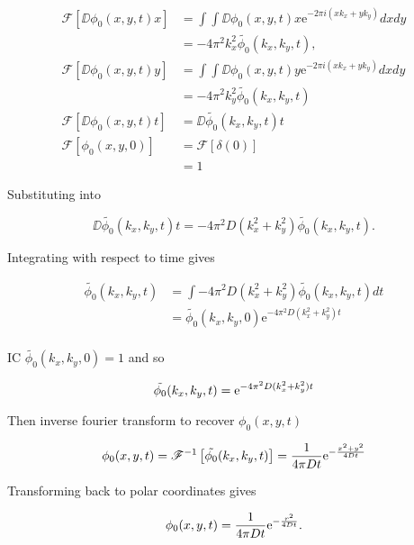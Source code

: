 \begin{equation}
\begin{split}
  \mathscr{F}\left[ \DD{\phi_0(x,y,t)}{x} \right] &= \int \int \DD{\phi_0(x,y,t)}{x} \mathrm{e}^{-2\pi i(xk_x + yk_y)} dx dy \\
  &= -4\pi^2k_x^2 \tilde{\phi_0}(k_x,k_y,t), \\
  \mathscr{F}\left[ \DD{\phi_0(x,y,t)}{y} \right] &= \int \int \DD{\phi_0(x,y,t)}{y} \mathrm{e}^{-2\pi i(xk_x + yk_y)} dx dy \\
  &= -4\pi^2k_y^2 \tilde{\phi_0}(k_x,k_y,t) \\
  \mathscr{F}\left[\DD{\phi_0(x,y,t)}{t}\right] &= \DD{\tilde{\phi_0}(k_x,k_y,t)}{t} \\
  \mathscr{F}\left[\phi_0(x,y,0)\right] &= \mathscr{F}\left[\delta(0)\right] \\
  &= 1
\end{split}
\end{equation}


Substituting into 

\begin{equation}
  \DD{\tilde{\phi_0}(k_x,k_y,t)}{t} = -4\pi^2D (k_x^2 + k_y^2) \tilde{\phi_0}(k_x,k_y,t).
\end{equation}

Integrating with respect to time gives

\begin{equation}
\begin{split}
  \tilde{\phi_0}(k_x,k_y,t) &= \int -4\pi^2D (k_x^2 + k_y^2) \tilde{\phi_0}(k_x,k_y,t) dt \\
  &= \tilde{\phi_0}(k_x,k_y,0)\mathrm{e}^{-4\pi^2D(k_x^2 + k_y^2)t} \\
\end{split}
\end{equation}

IC $ \tilde{\phi_0}(k_x,k_y,0) = 1$ and so

\begin{equation}
  \tilde{\phi_0}(k_x,k_y,t) = \mathrm{e}^{-4\pi^2D(k_x^2 + k_y^2)t} \\
\end{equation}

Then inverse fourier transform to recover $\phi_0(x,y,t)$

\begin{equation}
  \phi_0(x,y,t) = \mathscr{F}^{-1}\left[\tilde{\phi_0}(k_x,k_y,t)\right] = \frac{1}{4\pi Dt}\mathrm{e}^{-\frac{x^2 + y^2}{4Dt}} \\
\end{equation}

Transforming back to polar coordinates gives

\begin{equation}
  \phi_0(x,y,t) = \frac{1}{4\pi Dt}\mathrm{e}^{-\frac{r^2}{4Dt}} .\\
  \label{eqn:phi_0}
\end{equation}
